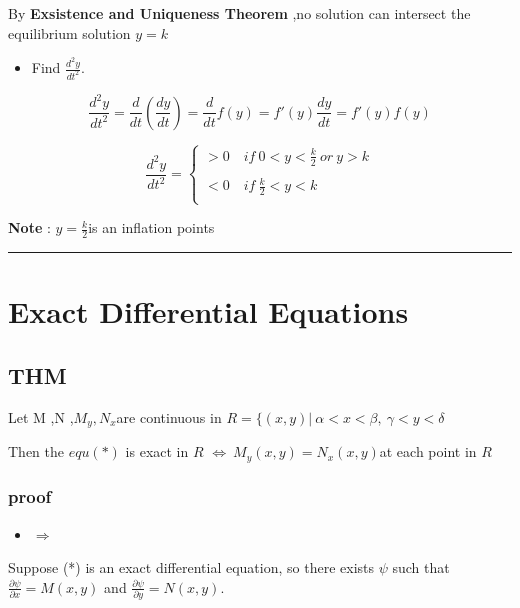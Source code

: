 \documentclass[12pt, a4paper]{article}
\theoremstyle{break}
\providecommand{\tightlist}{\setlength{\itemsep}{0pt}\setlength{\parskip}{0pt}}
\begin{document}
By \textbf{Exsistence and Uniqueness Theorem} ,no solution can intersect the equilibrium solution \(y = k\)

\begin{itemize}
\tightlist
\item
  Find \(\frac{d^2y}{dt^2}\).
\end{itemize}

\[
\boxed{\frac{d^2y}{dt^2}}  = \frac{d}{dt}(\frac{dy}{dt}) =\frac{d}{dt}f(y) = f'(y)\frac{dy}{dt} = \boxed{f'(y)f(y)}
\]

\[
\frac{d^2y}{dt^2} = \begin{cases} > 0 \quad if \ 0 < y < \frac{k}{2}\ or \ y > k \\ \quad \\ <0 \quad if \ \frac{k}{2}<y < k \\ \end{cases}
\]

\textbf{Note }: \(y = \frac{k}{2}\)is an inflation points

\begin{center}\rule{0.5\linewidth}{0.5pt}\end{center}

\section{Exact Differential Equations}\label{exact-differential-equations}

\subsection{THM}\label{thm}

Let M ,N ,\(M_y ,N_x\)are continuous in \(R = \{ (x ,y) |\  \alpha < x< \beta ,\ \gamma <y <\delta\)

Then the \(equ(*)\) is exact in \(R\) \(\Longleftrightarrow \ M_y(x ,y) = N_x(x ,y)\)at each point in \(R\)

\subsubsection{proof}\label{proof-1}

\begin{itemize}
\tightlist
\item
  \(\Longrightarrow\)
\end{itemize}

Suppose (*) is an exact differential equation, so there exists \(\psi\) such that \(\frac{\partial \psi}{\partial x} = M(x,y)\) and \(\frac{\partial \psi}{\partial y} = N(x,y)\).
\end{document}
